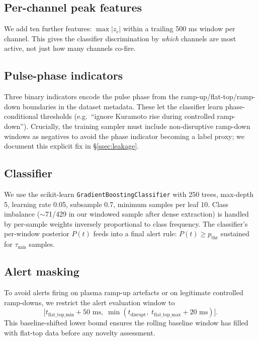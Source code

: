 \documentclass[11pt,letterpaper]{article}
\begin{document}
\subsection{Per-channel peak features}\label{ssec:peakz}

We add ten further features: $\max |z_c|$ within a trailing 500 ms
window per channel. This gives the classifier discrimination by
\emph{which} channels are most active, not just how many channels co-fire.

\subsection{Pulse-phase indicators}\label{ssec:phase}

Three binary indicators encode the pulse phase from the
ramp-up/flat-top/ramp-down boundaries in the dataset metadata. These let
the classifier learn phase-conditional thresholds (e.g.\ ``ignore
Kuramoto rise during controlled ramp-down''). Crucially, the training
sampler must include non-disruptive ramp-down windows as negatives to
avoid the phase indicator becoming a label proxy; we document this
explicit fix in \S\ref{ssec:leakage}.

\subsection{Classifier}\label{ssec:classifier}

We use the scikit-learn \texttt{GradientBoostingClassifier} with 250
trees, max-depth 5, learning rate 0.05, subsample 0.7, minimum samples
per leaf 10. Class imbalance ($\sim$71/429 in our windowed sample after
dense extraction) is handled by per-sample weights inversely proportional
to class frequency. The classifier's per-window posterior $P(t)$ feeds
into a final alert rule: $P(t) \ge p_{\mathrm{thr}}$ sustained for
$\tau_{\mathrm{min}}$ samples.

\subsection{Alert masking}\label{ssec:masking}

To avoid alerts firing on plasma ramp-up artefacts or on legitimate
controlled ramp-downs, we restrict the alert evaluation window to
\[
\bigl[t_{\mathrm{flat\_top\_min}} + 50\text{ ms},\; \min(t_{\mathrm{disrupt}},\; t_{\mathrm{flat\_top\_max}} + 20\text{ ms})\bigr].
\]
This baseline-shifted lower bound ensures the rolling baseline window
has filled with flat-top data before any novelty assessment.
\end{document}
